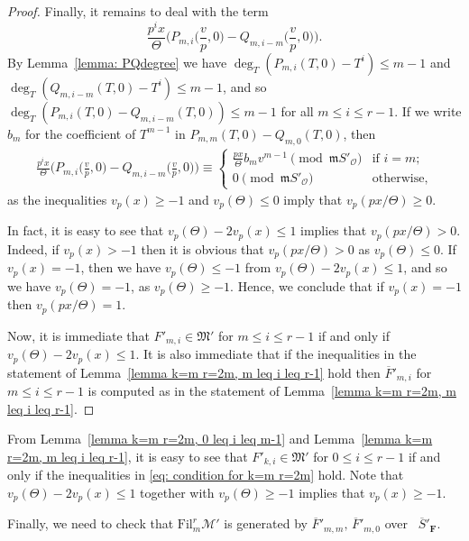 \documentclass[11pt]{amsart}
\theoremstyle{definition}
\numberwithin{equation}{subsection}
\theoremstyle{plain}
\theoremstyle{plain}
\theoremstyle{plain}
\theoremstyle{plain}
\theoremstyle{plain}
\theoremstyle{plain}
\theoremstyle{plain}
\theoremstyle{plain}
\theoremstyle{plain}
\theoremstyle{plain}
\theoremstyle{plain}
\theoremstyle{plain}
\theoremstyle{definition}
\theoremstyle{definition}
\theoremstyle{definition}
\theoremstyle{remark}
\renewcommand{\(}{\textup{(}}
\renewcommand{\)}{\textup{)}}
\newcommand{\F}{\mathbf{F}}
\newcommand{\barS}{\overline{S}}
\newcommand{\cM}{\mathcal{M}}
\newcommand{\fM}{\mathfrak{M}}
\newcommand{\fm}{\mathfrak{m}}
\newcommand{\Fil}{\mathrm{Fil}}
\newcommand{\cO}{\mathcal{O}}
\newcommand{\barF}{\overline{F}}
\begin{document}
\begin{proof}
Finally, it remains to deal with the term $$\frac{p^ix}{\Theta}\Big(P_{m,i}\Big(\frac{v}{p},0\Big) -Q_{m,i-m}\Big(\frac{v}{p},0\Big)\Big).$$ By Lemma~\ref{lemma: PQdegree} we have $\deg_T(P_{m,i}(T,0)-T^i)\leq m-1$ and $\deg_T(Q_{m,i-m}(T,0)-T^i)\leq m-1$, and so $\deg_T\left(P_{m,i}(T,0)-Q_{m,i-m}(T,0)\right)\leq m-1$ for all $m\leq i \leq r-1$. If we write $b_m$ for the coefficient of $T^{m-1}$ in $P_{m,m}(T,0)-Q_{m,0}(T,0)$, then
\begin{align*}
    \frac{p^ix}{\Theta}
    \Big(P_{m,i}\Big(\frac{v}{p},0\Big)-Q_{m,i-m}\Big(\frac{v}{p},0\Big)\Big)
    \equiv
    \begin{cases}
        \frac{px}{\Theta}b_mv^{m-1}\pmod{\fm S'_\cO} & \mbox{if } i=m; \\
        0 \pmod{\fm S'_\cO} & \mbox{otherwise,}
    \end{cases}
\end{align*}
as the inequalities $v_p(x)\geq -1$ and $v_p(\Theta)\leq 0$ imply that $v_p(px/\Theta)\geq 0$.

In fact, it is easy to see that $v_p(\Theta)-2v_p(x)\leq 1$ implies that $v_p(px/\Theta)>0$. Indeed, if $v_p(x)>-1$ then it is obvious that $v_p(px/\Theta)>0$ as $v_p(\Theta)\leq 0$. If $v_p(x)=-1$, then we have $v_p(\Theta)\leq -1$ from $v_p(\Theta)-2v_p(x)\leq 1$, and so we have $v_p(\Theta)=-1$, as $v_p(\Theta)\geq -1$.
Hence, we conclude that if $v_p(x)=-1$ then $v_p(px/\Theta)=1$.

Now, it is immediate that $F'_{m,i}\in\fM'$ for $m\leq i\leq r-1$ if and only if $v_p(\Theta)-2v_p(x)\leq 1$. It is also immediate that if the inequalities in the statement of Lemma~\ref{lemma k=m r=2m, m leq i leq r-1} hold then $\barF'_{m,i}$ for $m\leq i\leq r-1$ is computed as in the statement of Lemma~\ref{lemma k=m r=2m, m leq i leq r-1}.
\end{proof}



From Lemma~\ref{lemma k=m r=2m, 0 leq i leq m-1} and Lemma~\ref{lemma k=m r=2m, m leq i leq r-1}, it is easy to see that
$F'_{k,i}\in\fM'$ for $0\leq i\leq r-1$ if and only if the inequalities in \eqref{eq: condition for k=m r=2m} hold. Note that $v_p(\Theta)-2v_p(x)\leq 1$ together with $v_p(\Theta)\geq -1$ implies that $v_p(x)\geq -1$.

Finally, we need to check that $\Fil^r_{m}\cM'$ is generated by $\barF'_{m,m},\,\barF'_{m,0}$ over~ $\barS'_\F$.
\end{document}
